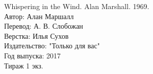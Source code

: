 \mbox{}
\vfill
\begin{center}
Whispering in the Wind. Alan Marshall. 1969.\\
Автор: Алан Маршалл\\
Перевод: А. В. Слобожан\\
Верстка: Илья Сухов\\
Издательство: "Только для вас"\\
Год выпуска: 2017\\
Тираж 1 экз.
\end{center}

